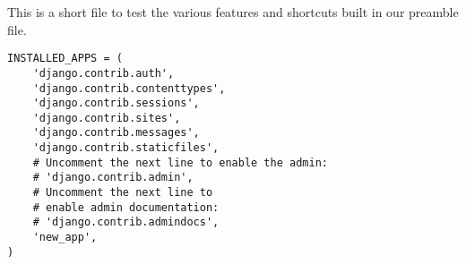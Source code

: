 





This is a short file to test the various features and shortcuts built in our preamble file.

\begin{verbatim}
INSTALLED_APPS = (
    'django.contrib.auth',
    'django.contrib.contenttypes',
    'django.contrib.sessions',
    'django.contrib.sites',
    'django.contrib.messages',
    'django.contrib.staticfiles',
    # Uncomment the next line to enable the admin:
    # 'django.contrib.admin',
    # Uncomment the next line to
    # enable admin documentation:
    # 'django.contrib.admindocs',
    'new_app',
)
\end{verbatim}



